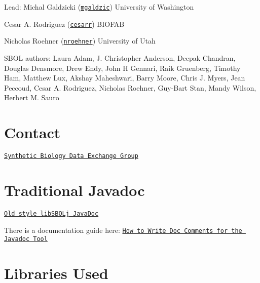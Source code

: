 \begin{DoxyItemize}
\item Lead: Michal Galdzicki (\href{http://github.com/mgaldzic}{\tt mgaldzic}) University of Washington
\item Cesar A. Rodriguez (\href{http://github.com/cesarr}{\tt cesarr}) BIOFAB
\item Nicholas Roehner (\href{http://github.com/nroehner}{\tt nroehner}) University of Utah
\item SBOL authors: Laura Adam, J. Christopher Anderson, Deepak Chandran, Douglas Densmore, Drew Endy, John H Gennari, Raik Gruenberg, Timothy Ham, Matthew Lux, Akshay Maheshwari, Barry Moore, Chris J. Myers, Jean Peccoud, Cesar A. Rodriguez, Nicholas Roehner, Guy-\/Bart Stan, Mandy Wilson, Herbert M. Sauro
\end{DoxyItemize}\hypertarget{index_contact_sec}{}\section{Contact}\label{index_contact_sec}

\begin{DoxyItemize}
\item \href{http://groups.google.com/group/synbiodex/}{\tt Synthetic Biology Data Exchange Group}
\end{DoxyItemize}\hypertarget{index_javadoc_old}{}\section{Traditional Javadoc}\label{index_javadoc_old}

\begin{DoxyItemize}
\item \href{../../../documentation/classic_javadoc/index.html}{\tt Old style libSBOLj JavaDoc}
\item There is a documentation guide here: \href{http://www.oracle.com/technetwork/java/javase/documentation/index-137868.html}{\tt How to Write Doc Comments for the Javadoc Tool}
\end{DoxyItemize}\hypertarget{index_included_sec}{}\section{Libraries Used}\label{index_included_sec}


